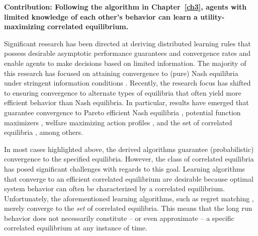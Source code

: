 


\smallskip

\noindent\textbf{Contribution: Following the algorithm in Chapter~\ref{ch3}, agents with limited knowledge of each other's behavior can learn a utility-maximizing correlated equilibrium.}


Significant research has been directed at deriving distributed learning rules that possess desirable asymptotic performance guarantees and convergence rates and enable agents to make decisions based on limited information. The majority of this research has focused on attaining convergence to (pure) Nash equilibria under stringent information conditions \cite{Young2009, Frihauf2012, Foster2006, Boussaton2012, Poveda2013, Gharesifard2012}. Recently, the research focus has shifted to ensuring convergence to alternate types of equilibria that often yield more efficient behavior than Nash equilibria.  In particular, results have emerged that guarantee convergence to Pareto efficient Nash equilibria \cite{Marden2009,Pradelski2012}, potential function maximizers \cite{Blume1993, Marden2012}, welfare maximizing action profiles \cite{Marden2011, Arieli2012}, and the set of correlated equilibria \cite{Hart2000,Marden2013c,Aumann1987,Foster1997}, among others.  

In most cases highlighted above, the derived algorithms guarantee (probabilistic) convergence to the specified equilibria.  However, the class of correlated equilibria has posed significant challenges with regards to this goal. Learning algorithms that converge to an efficient correlated equilibrium are desirable because optimal system behavior can often be characterized by a correlated equilibrium. Unfortunately, the aforementioned learning algorithms, such as regret matching \cite{Hart2000}, merely converge to the \emph{set} of correlated equilibria. This means that the long run behavior does not necessarily constitute -- or even approximate -- a specific correlated equilibrium at any instance of time.

